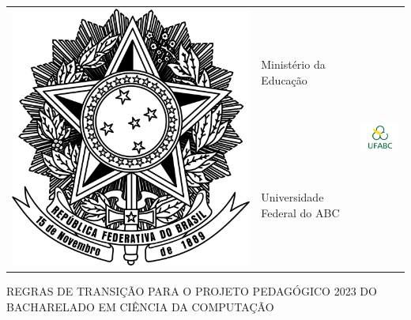 \documentclass[a4paper]{article}
\begin{document}
\begin{tabular}{rp{}r}
    \multirow{2}{*}{\includegraphics[scale=.03]{imagens/brasao.png}} & 
    \centering \Large{Ministério da Educação} & \multirow{2}{*}{\includegraphics[scale=2.3]{imagens/ufabc-logo.png}} \\
    & \centering \Large{Universidade Federal do ABC} &\\
\end{tabular}

\vspace{9cm}

\begin{center}
    \Large{REGRAS DE TRANSIÇÃO PARA O PROJETO PEDAGÓGICO 2023 DO \\BACHARELADO EM CIÊNCIA DA COMPUTAÇÃO}
\end{center}

\vspace{9cm}
\end{document}
